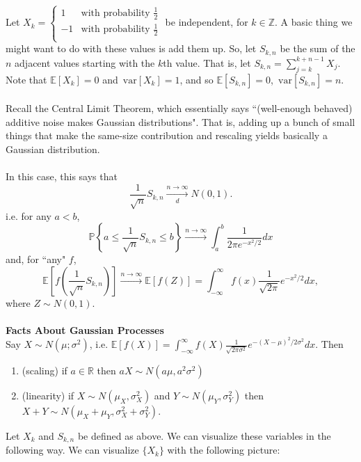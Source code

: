 \documentclass{article}
\theoremstyle{definition}
\newcommand{\E}{\mathbb{E}}
\newcommand{\PP}{\mathbb{P}}
\newcommand{\R}{\mathbb{R}}
\newcommand{\Z}{\mathbb{Z}}
\newcommand{\var}{\,\mathrm{var}}
\newcommand{\style}{\displaystyle} %
\begin{document}
Let $X_k=\left\{\begin{array}{cc}
1 &\text{with probability }\frac{1}{2}\\
-1 & \text{with probability }\frac{1}{2}\\
\end{array}\right.$ be independent, for $k\in\Z$.  A basic thing we might want to do with these values is add them up.  So, let $S_{k,n}$ be the sum of the $n$ adjacent values starting with the $k$th value.  That is, let $S_{k,n}=\sum_{j=k}^{k+n-1}X_j$.  Note that $\E[X_k]=0$ and $\var[X_k]=1$, and so $\E[S_{k,n}]=0$, $\var[S_{k,n}]=n$.\\\\
Recall the Central Limit Theorem, which essentially says ``(well-enough behaved) additive noise makes Gaussian distributions".  That is, adding up a bunch of small things that make the same-size contribution and rescaling yields basically a Gaussian distribution.\\\\
In this case, this says that \[\frac{1}{\sqrt{n}}S_{k,n}\xrightarrow[d]{n\to\infty} N(0,1).\]  i.e. for any $a<b$, \[\PP\left\{a\leq\frac{1}{\sqrt{n}}S_{k,n}\leq b\right\}\xrightarrow{n\to\infty}\int_a^b \frac{1}{2\pi e^{-x^2/2}}dx\] and, for ``any" $f$, \begin{equation}
\E\left[f\left(\frac{1}{\sqrt{n}}S_{k,n}\right)\right]\xrightarrow{n\to\infty}\E[f(Z)]=\int_{-\infty}^\infty f(x)\frac{1}{\sqrt{2\pi}}e^{-x^2/2}dx,
\end{equation} where $Z\sim N(0,1)$.\\\\

\textbf{\Large Facts About Gaussian Processes}\\

Say $X\sim N(\mu;\sigma^2)$, i.e. $\style\E[f(X)]=\int_{-\infty}^\infty f(X)\frac{1}{\sqrt{2\pi\sigma^2}}e^{-(X-\mu)^2/2\sigma^2}dx$.  Then \begin{enumerate}

\item (scaling) if $a\in\R$ then $aX\sim N(a\mu,a^2\sigma^2)$
\item (linearity) if $X\sim N(\mu_X,\sigma_X^2)$ and $Y\sim N(\mu_Y,\sigma_Y^2)$ then $X+Y\sim N(\mu_X+\mu_Y,\sigma_X^2+\sigma_Y^2)$.

\end{enumerate}

Let $X_k$ and $S_{k,n}$ be defined as above.  We can visualize these variables in the following way.  We can visualize $\{X_k\}$ with the following picture:
\begin{center}
\end{center}
\end{document}
